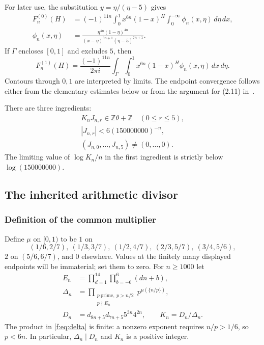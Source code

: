 \documentclass[11pt]{amsart}
\newcommand{\Z}{\mathbb Z}
\newcommand{\dd}{\,d}
\theoremstyle{plain}
\theoremstyle{remark}\newtheorem{remark}[theorem]{Remark}
\numberwithin{equation}{section}
\begin{document}
For later use, the substitution $y=\eta/(\eta-5)$ gives
\begin{align}\label{f:eq:transformed-zero}
 F_n^{(0)}(H)
 &=(-1)^{11n}\int_0^1 x^{6n}(1-x)^H
 \int_0^{-\infty}\phi_n(x,\eta)\dd\eta\dd x,\\
 \phi_n(x,\eta)
 &=\frac{\eta^{4n}(1-\eta)^{4n}}
 {(x-\eta)^{5n+1}(\eta-5)^{7n+1}}.\label{f:eq:phi}
\end{align}
If $\Gamma$ encloses $[0,1]$ and excludes $5$, then
\begin{equation}\label{f:eq:transformed-one}
 F_n^{(1)}(H)=\frac{(-1)^{11n}}{2\pi i}
 \int_\Gamma\int_0^1 x^{6n}(1-x)^H\phi_n(x,\eta)\dd x\dd\eta.
\end{equation}
Contours through $0,1$ are interpreted by limits. The endpoint convergence follows either from the elementary estimates below or from the argument for (2.11) in~\cite{VZ18}.

There are three ingredients:
\begin{equation}\label{f:eq:three}
 \begin{gathered}
 K_nJ_{n,r}\in\Z\theta+\Z\quad(0\leq r\leq5),\\
 |J_{n,r}|<6(150000000)^{-n},\\
 (J_{n,0},\ldots,J_{n,5})\ne(0,\ldots,0).
 \end{gathered}
\end{equation}
The limiting value of $\log K_n/n$ in the first ingredient is strictly below $\log(150000000)$.

\subsection{The inherited arithmetic divisor}\label{f:sec:arithmetic}
\subsubsection{Definition of the common multiplier}
Define $\mu$ on $[0,1)$ to be $1$ on
\[
 (1/6,2/7),\ (1/3,3/7),\ (1/2,4/7),\ (2/3,5/7),\ (3/4,5/6),
\]
$2$ on $(5/6,6/7)$, and $0$ elsewhere. Values at the finitely many displayed endpoints will be immaterial; set them to zero.
For $n\geq1000$ let
\begin{align}
 E_n&=\prod_{d=1}^{14}\prod_{b=-6}^{6}(dn+b),\label{f:eq:exceptional}\\
 \Delta_n&=\prod_{\substack{p\ \mathrm{prime},\ p>n/2\\p\nmid E_n}}
 p^{\mu(\{n/p\})},\label{f:eq:delta}\\
 D_n&=d_{8n+5}d_{7n+5}5^{3n}4^{2n},\qquad
 K_n=D_n/\Delta_n.\label{f:eq:K}
\end{align}
The product in \eqref{f:eq:delta} is finite: a nonzero exponent requires $n/p>1/6$, so $p<6n$. In particular, $\Delta_n\mid D_n$ and $K_n$ is a positive integer.
\end{document}
